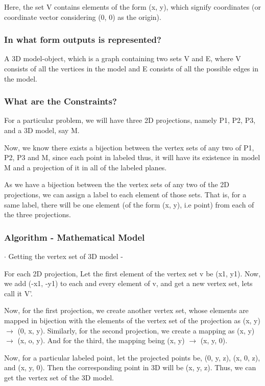 \documentclass[12pt]{article}
\begin{document}
Here, the set V contains elements of the form (x, y), which signify coordinates (or coordinate vector considering (0, 0) as the origin).

\subsubsection{In what form outputs is represented?}
A 3D model-object, which is a graph containing two sets V and E, where V consists of all the vertices in the model and E consists of all the possible edges in the model.

\subsubsection{What are the Constraints?}
For a particular problem, we will have three 2D projections, namely P1, P2, P3, and a 3D model, say M. 

Now, we know there exists a bijection between the vertex sets of any two of P1, P2, P3 and M, since each point in labeled thus, it will have its existence in model M and a projection of it in all of the labeled planes.


As we have a bijection between the the vertex sets of any two of the 2D projections, we can assign a label to each element of those sets. That is, for a same label, there will be one element (of the form (x, y), i.e point) from each of the three projections. 


\subsubsection{Algorithm - Mathematical Model}
$\cdot$ Getting the vertex set of 3D model - 

For each 2D projection,
Let the first element of the vertex set v be (x1, y1). 
Now, we add (-x1, -y1) to each and every element of v, and get a new vertex set, lets call it V'.

Now, for the first projection, we create another vertex set, whose elements are mapped in bijection with the elements of the vertex set of the projection as (x, y) $\rightarrow$ (0, x, y).
Similarly, for the second projection, we create a mapping as (x, y) $\rightarrow$ (x, o, y).
And for the third, the mapping being (x, y) $\rightarrow$ (x, y, 0).

Now, for a particular labeled point, let the projected points be, (0, y, z), (x, 0, z), and (x, y, 0). Then the corresponding point in 3D will be (x, y, z). Thus, we can get the vertex set of the 3D model.
\end{document}
